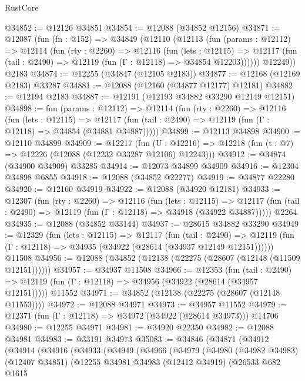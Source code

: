\begin{lexlean}{RustCore}
\begin{coremodule}
@34852 := @12126 @34851
@34854 := @12088 (@34852 @12156)
@34871 := @12087
    (fun (fn : @152) =>
    @34849
      (@12110
        (@12113
          (fun (params : @12112) =>
          @12114
            (fun (rty : @2260) =>
            @12116
              (fun (lets : @12115) =>
              @12117 (fun (tail : @2490) => @12119 (fun (Γ : @12118) => @34854 @12203))))))
        @12249))
    @2183
@34874 := @12255 (@34847 (@12105 @2183))
@34877 := @12168 (@12169 @2183) @33287
@34881 := @12088 (@12160 (@34877 @12177) @12181)
@34882 := @12194 @2183
@34887 := @12191 (@12193 @34882 @33290 @12149 @12151)
@34898 := fun (params : @12112) =>
  @12114
    (fun (rty : @2260) =>
    @12116
      (fun (lets : @12115) =>
      @12117 (fun (tail : @2490) => @12119 (fun (Γ : @12118) => @34854 (@34881 @34887)))))
@34899 := @12113 @34898
@34900 := @12110 @34899
@34909 := @12217
    (fun (U : @12216) => @12218 (fun (t : @7) => @12226 (@12088 (@12232 @33287 @12106) @12243)))
@34912 := @34874 (@34900 @34909) @33285
@34914 := @12073 @34899 @34909
@34916 := @12304 @34898 @6855
@34918 := @12088 (@34852 @22277)
@34919 := @34877 @22280
@34920 := @12160 @34919
@34922 := @12088 (@34920 @12181)
@34933 := @12307
    (fun (rty : @2260) =>
    @12116
      (fun (lets : @12115) =>
      @12117 (fun (tail : @2490) => @12119 (fun (Γ : @12118) => @34918 (@34922 @34887)))))
    @2264
@34935 := @12088 (@34852 @33144)
@34937 := @28615 @34882 @33290
@34949 := @12329
    (fun (lets : @12115) =>
    @12117
      (fun (tail : @2490) =>
      @12119 (fun (Γ : @12118) => @34935 (@34922 (@28614 (@34937 @12149 @12151))))))
    @11508
@34956 := @12088 (@34852 (@12138 (@22275 (@28607 (@12148 (@11509 @12151))))))
@34957 := @34937 @11508
@34966 := @12353
    (fun (tail : @2490) => @12119 (fun (Γ : @12118) => @34956 (@34922 (@28614 (@34957 @12151)))))
    @11552
@34971 := @34852 (@12138 (@22275 (@28607 (@12148 @11553))))
@34972 := @12088 @34971
@34973 := @34957 @11552
@34979 := @12371 (fun (Γ : @12118) => @34972 (@34922 (@28614 @34973))) @14706
@34980 := @12255 @34971
@34981 := @34920 @22350
@34982 := @12088 @34981
@34983 := @33191 @34973
@35083 := @34846
    (@34871
      (@34912
        (@34914
          (@34916
            (@34933
              (@34949
                (@34966
                  (@34979
                    (@34980
                      (@34982 @34983)
                      (@12407 @34851)
                      (@12255
                        @34981
                        @34983
                        (@12412 @34919)
                        (@26533
                          @682
                          @1615

\end{coremodule}
\end{lexlean}
